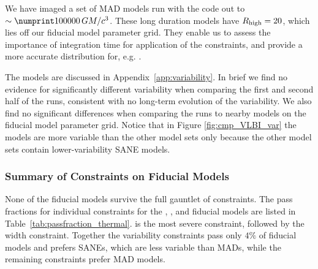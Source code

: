 
We have imaged a set of MAD models run with the \koral code out to $\sim \no{100000}\,\tg$.  These long duration  models have $R_\mathrm{high} = 20$, which lies off our fiducial model parameter grid.  They enable us to assess the importance of integration time for application of the constraints, and provide a more accurate distribution for, e.g. .  

The \koral models are discussed in Appendix~\ref{app:variability}. In brief we find no evidence for significantly different variability when comparing the first and second half of the \koral runs, consistent with no long-term evolution of the variability.  We also find no significant differences when comparing the \koral runs to nearby models on the fiducial model parameter grid.  Notice that in Figure \ref{fig:cmp_VLBI_var} the \koral models are more variable than the other model sets only because the other model sets contain lower-variability SANE models.


\subsubsection{Summary of Constraints on Fiducial Models}
\label{sec:summarythermal}





None of the fiducial models  survive the full gauntlet of constraints. The pass fractions for individual constraints for the \bhac, \kharma, and \hamr fiducial models are listed in Table~\ref{tab:passfraction_thermal}.
 is the most severe constraint, followed by the \mring width constraint.
Together the variability constraints pass only $4\%$ of fiducial models and prefers SANEs, which are less variable than MADs, while the remaining constraints prefer MAD models.

